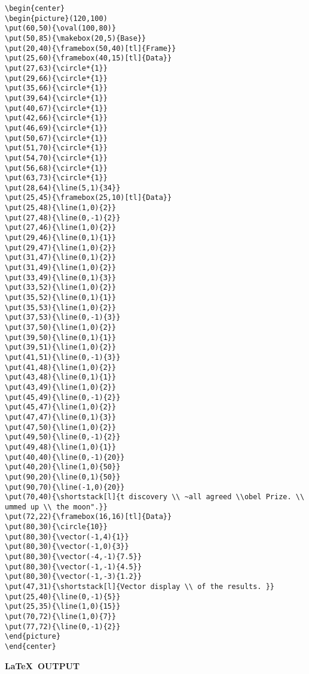 \newpage

{\footnotesize
\begin{verbatim}
\begin{center}
\begin{picture}(120,100)
\put(60,50){\oval(100,80)}
\put(50,85){\makebox(20,5){Base}}
\put(20,40){\framebox(50,40)[tl]{Frame}}
\put(25,60){\framebox(40,15)[tl]{Data}}
\put(27,63){\circle*{1}}
\put(29,66){\circle*{1}}
\put(35,66){\circle*{1}}
\put(39,64){\circle*{1}}
\put(40,67){\circle*{1}}
\put(42,66){\circle*{1}}
\put(46,69){\circle*{1}}
\put(50,67){\circle*{1}}
\put(51,70){\circle*{1}}
\put(54,70){\circle*{1}}
\put(56,68){\circle*{1}}
\put(63,73){\circle*{1}}
\put(28,64){\line(5,1){34}}
\put(25,45){\framebox(25,10)[tl]{Data}}
\put(25,48){\line(1,0){2}}
\put(27,48){\line(0,-1){2}}
\put(27,46){\line(1,0){2}}
\put(29,46){\line(0,1){1}}
\put(29,47){\line(1,0){2}}
\put(31,47){\line(0,1){2}}
\put(31,49){\line(1,0){2}}
\put(33,49){\line(0,1){3}}
\put(33,52){\line(1,0){2}}
\put(35,52){\line(0,1){1}}
\put(35,53){\line(1,0){2}}
\put(37,53){\line(0,-1){3}}
\put(37,50){\line(1,0){2}}
\put(39,50){\line(0,1){1}}
\put(39,51){\line(1,0){2}}
\put(41,51){\line(0,-1){3}}
\put(41,48){\line(1,0){2}}
\put(43,48){\line(0,1){1}}
\put(43,49){\line(1,0){2}}
\put(45,49){\line(0,-1){2}}
\put(45,47){\line(1,0){2}}
\put(47,47){\line(0,1){3}}
\put(47,50){\line(1,0){2}}
\put(49,50){\line(0,-1){2}}
\put(49,48){\line(1,0){1}}
\put(40,40){\line(0,-1){20}}
\put(40,20){\line(1,0){50}}
\put(90,20){\line(0,1){50}}
\put(90,70){\line(-1,0){20}}
\put(70,40){\shortstack[l]{t discovery \\ ~all agreed \\obel Prize. \\
ummed up \\ the moon".}}
\put(72,22){\framebox(16,16)[tl]{Data}}
\put(80,30){\circle{10}}
\put(80,30){\vector(-1,4){1}}
\put(80,30){\vector(-1,0){3}}
\put(80,30){\vector(-4,-1){7.5}}
\put(80,30){\vector(-1,-1){4.5}}
\put(80,30){\vector(-1,-3){1.2}}
\put(47,31){\shortstack[l]{Vector display \\ of the results. }}
\put(25,40){\line(0,-1){5}}
\put(25,35){\line(1,0){15}}
\put(70,72){\line(1,0){7}}
\put(77,72){\line(0,-1){2}}
\end{picture}
\end{center}
\end{verbatim}
}

\newpage

\begin{center}
{\bf \LaTeX\ OUTPUT}
\end{center}

